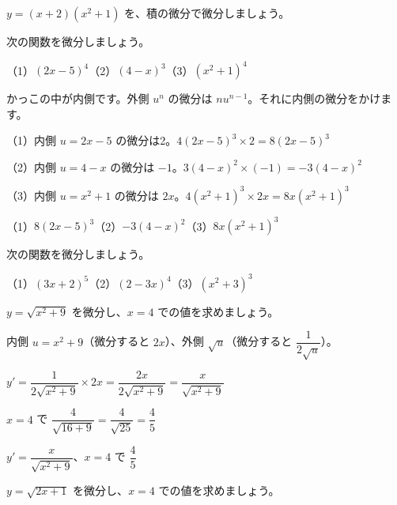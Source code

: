 \begin{jibun}
$y=(x+2)(x^2+1)$ を、積の微分で微分しましょう。
\end{jibun}

\begin{reidai}[かっこの $n$ 乗]
次の関数を微分しましょう。\par
（1）$(2x-5)^4$\quad（2）$(4-x)^3$\quad（3）$(x^2+1)^4$\par
\kangaekata かっこの中が内側です。外側 $u^n$ の微分は $nu^{n-1}$。それに内側の微分をかけます。\par
\shiki（1）内側 $u=2x-5$ の微分は2。$4(2x-5)^3\times2=8(2x-5)^3$\par
\hspace*{2.6\zw}（2）内側 $u=4-x$ の微分は $-1$。$3(4-x)^2\times(-1)=-3(4-x)^2$\par
\hspace*{2.6\zw}（3）内側 $u=x^2+1$ の微分は $2x$。$4(x^2+1)^3\times2x=8x(x^2+1)^3$\par
\kotae （1）$8(2x-5)^3$\quad（2）$-3(4-x)^2$\quad（3）$8x(x^2+1)^3$
\end{reidai}

\begin{jibun}
次の関数を微分しましょう。\par
（1）$(3x+2)^5$\quad（2）$(2-3x)^4$\quad（3）$(x^2+3)^3$
\end{jibun}

\begin{reidai}[ルートをふくむ式]
$y=\sqrt{x^2+9}$ を微分し、$x=4$ での値を求めましょう。\par
\kangaekata 内側 $u=x^2+9$（微分すると $2x$）、外側 $\sqrt{u}$（微分すると $\dfrac{1}{2\sqrt{u}}$）。\par
\shiki $y'=\dfrac{1}{2\sqrt{x^2+9}}\times2x=\dfrac{2x}{2\sqrt{x^2+9}}=\dfrac{x}{\sqrt{x^2+9}}$\par
\hspace*{2.6\zw}$x=4$ で $\dfrac{4}{\sqrt{16+9}}=\dfrac{4}{\sqrt{25}}=\dfrac{4}{5}$\par
\kotae $y'=\dfrac{x}{\sqrt{x^2+9}}$、$x=4$ で $\dfrac{4}{5}$
\end{reidai}

\begin{jibun}
$y=\sqrt{2x+1}$ を微分し、$x=4$ での値を求めましょう。
\end{jibun}

